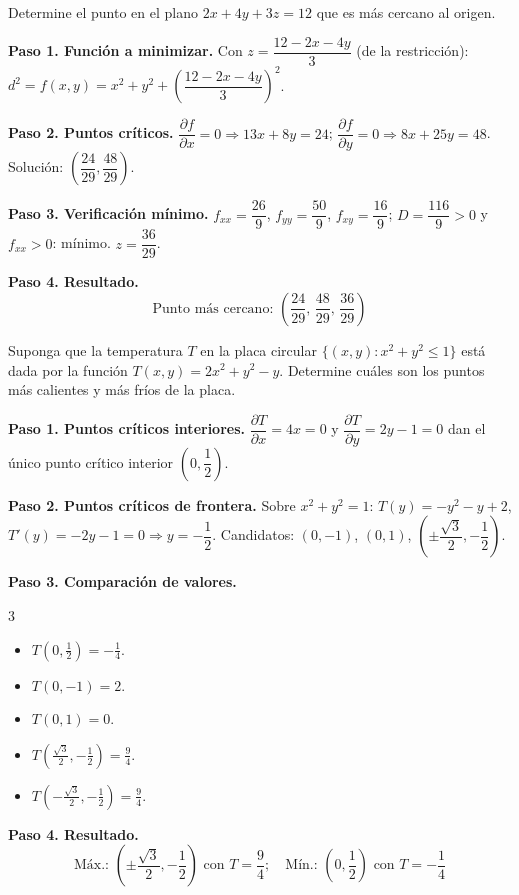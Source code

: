 \begin{prob}
Determine el punto en el plano $2x+4y+3z=12$ que es más cercano al origen.
\begin{myproof}
\textbf{Paso 1. Función a minimizar.}
Con $z=\dfrac{12-2x-4y}{3}$ (de la restricción): $d^2=f(x,y)=x^2+y^2+\left(\dfrac{12-2x-4y}{3}\right)^2$.

\textbf{Paso 2. Puntos críticos.}
$\dfrac{\partial f}{\partial x}=0\Rightarrow 13x+8y=24$; $\dfrac{\partial f}{\partial y}=0\Rightarrow 8x+25y=48$. Solución: $\left(\dfrac{24}{29},\dfrac{48}{29}\right)$.

\textbf{Paso 3. Verificación mínimo.}
$f_{xx}=\dfrac{26}{9}$, $f_{yy}=\dfrac{50}{9}$, $f_{xy}=\dfrac{16}{9}$; $D=\dfrac{116}{9}>0$ y $f_{xx}>0$: mínimo.
$z=\dfrac{36}{29}$.

\textbf{Paso 4. Resultado.}
\[
\boxed{\text{Punto más cercano: }\left(\dfrac{24}{29},\,\dfrac{48}{29},\,\dfrac{36}{29}\right)}
\]
\end{myproof}
\end{prob}
\begin{prob}
Suponga que la temperatura $T$ en la placa circular $\{  (x,y): x^2+y^2\leq 1 \}$ está dada por la función $T(x,y)=2x^2+y^2-y.$ Determine cuáles son los puntos más calientes y más fríos de la placa.
\begin{myproof}
\textbf{Paso 1. Puntos críticos interiores.}
$\dfrac{\partial T}{\partial x}=4x=0$ y $\dfrac{\partial T}{\partial y}=2y-1=0$ dan el único punto crítico interior $\left(0,\dfrac{1}{2}\right)$.

\textbf{Paso 2. Puntos críticos de frontera.}
Sobre $x^2+y^2=1$: $T(y)=-y^2-y+2$, $T'(y)=-2y-1=0\Rightarrow y=-\dfrac{1}{2}$. Candidatos: $(0,-1)$, $(0,1)$, $\left(\pm\dfrac{\sqrt{3}}{2},-\dfrac{1}{2}\right)$.

\textbf{Paso 3. Comparación de valores.}
 \begin{multicols}{3}
 \begin{itemize}
 \item $T\!\left(0,\tfrac{1}{2}\right)=-\tfrac{1}{4}.$
 \item $T\!\left(0,-1\right)=2.$
 \item $T\!\left(0,1\right)=0.$
 \item $T\!\left(\tfrac{\sqrt{3}}{2},-\tfrac{1}{2}\right)=\tfrac{9}{4}.$
 \item $T\!\left(-\tfrac{\sqrt{3}}{2},-\tfrac{1}{2}\right)=\tfrac{9}{4}.$
 \end{itemize}
\end{multicols}

\textbf{Paso 4. Resultado.}
\[
\boxed{\text{Máx.: }\left(\pm\dfrac{\sqrt{3}}{2},-\dfrac{1}{2}\right)\text{ con }T=\dfrac{9}{4};\quad\text{Mín.: }\left(0,\dfrac{1}{2}\right)\text{ con }T=-\dfrac{1}{4}}
\]
\end{myproof}
\end{prob}
